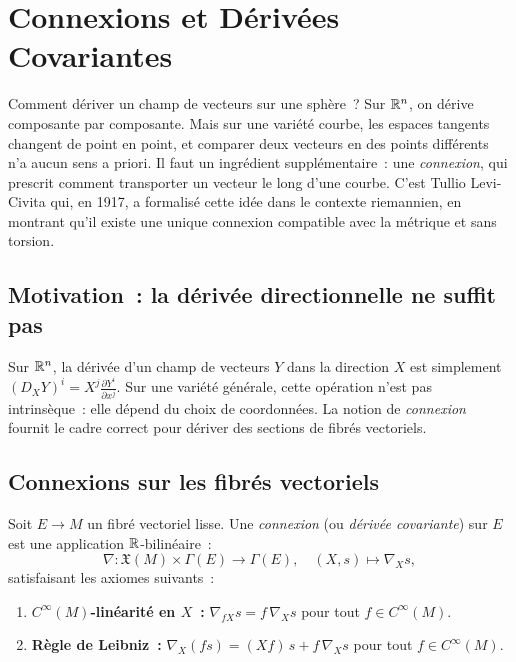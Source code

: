 \chapter{Connexions et D\'eriv\'ees Covariantes}
\label{ch:connexions}

Comment d\'eriver un champ de vecteurs sur une sph\`ere~? Sur $\mathbb{R}^n$, on
d\'erive composante par composante. Mais sur une vari\'et\'e courbe, les
espaces tangents changent de point en point, et comparer deux vecteurs en
des points diff\'erents n'a aucun sens a priori. Il faut un ingr\'edient
suppl\'ementaire~: une \emph{connexion}, qui prescrit comment
\og transporter\fg{} un vecteur le long d'une courbe. C'est Tullio
Levi-Civita qui, en 1917, a formalis\'e cette id\'ee dans le contexte
riemannien, en montrant qu'il existe une unique connexion compatible avec
la m\'etrique et sans torsion.

\section{Motivation~: la d\'eriv\'ee directionnelle ne suffit pas}

Sur $\mathbb{R}^n$, la d\'eriv\'ee d'un champ de vecteurs $Y$ dans la direction $X$ est
simplement $(D_X Y)^i = X^j \frac{\partial Y^i}{\partial x^j}$. Sur une vari\'et\'e
g\'en\'erale, cette op\'eration n'est pas intrins\`eque~: elle d\'epend du choix de
coordonn\'ees. La notion de \emph{connexion} fournit le cadre correct pour d\'eriver
des sections de fibr\'es vectoriels.

\section{Connexions sur les fibr\'es vectoriels}

\begin{definition}
Soit $E \to M$ un fibr\'e vectoriel lisse. Une \emph{connexion} (ou \emph{d\'eriv\'ee
covariante}) sur $E$ est une application $\mathbb{R}$-bilin\'eaire~:
\[
    \nabla : \mathfrak{X}(M) \times \Gamma(E) \to \Gamma(E),
    \quad (X, s) \mapsto \nabla_X s,
\]
satisfaisant les axiomes suivants~:
\begin{enumerate}
    \item \textbf{$C^\infty(M)$-lin\'earit\'e en $X$~:} $\nabla_{fX} s = f\, \nabla_X s$
          pour tout $f \in C^\infty(M)$.
    \item \textbf{R\`egle de Leibniz~:} $\nabla_X(fs) = (Xf)\, s + f\, \nabla_X s$
          pour tout $f \in C^\infty(M)$.
\end{enumerate}
\end{definition}

